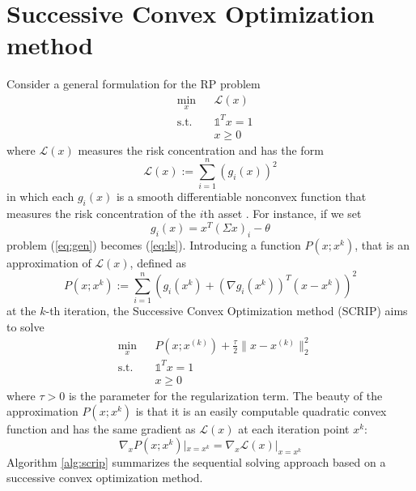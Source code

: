 \section{Successive Convex Optimization method}
Consider a general formulation for the RP problem
\begin{equation}\label{eq:gen}
\begin{aligned}
& \underset{x}{\text{min}}
&& \mathcal{L}(x)\\
& \text{s.t.}
&&\mathds{1}^T x = 1\\
&&&x \geq 0
\end{aligned}
\end{equation}
where $\mathcal{L}(x)$ measures the risk concentration and has the form
\begin{equation}
\mathcal{L}(x) := \sum_{i=1}^n (g_i(x))^2
\end{equation}
in which each $g_i(x)$ is a smooth differentiable nonconvex
function that measures the risk concentration of the $i$th asset \cite{scrip}. For instance, if we set
\begin{equation}
g_i(x) = x^T (\Sigma x)_i - \theta
\end{equation}
problem (\ref{eq:gen}) becomes (\ref{eq:ls}). Introducing a function $P(x;x^{k})$, that is an approximation of $\mathcal{L}(x)$, defined as
\begin{equation}
P(x;x^{k}) := \sum_{i=1}^n (g_i(x^{k}) + (\nabla g_i(x^{k}))^T (x-x^{k}))^2
\end{equation}
at the $k$-th iteration, the Successive Convex Optimization method (SCRIP) aims to solve 
\begin{equation}\label{eq:scrip1}
\begin{aligned}
& \underset{x}{\text{min}}
&&P(x;x^{(k)}) + \frac{\tau}{2}\parallel x - x^{(k)} \parallel^2_2\\
& \text{s.t.}
&&\mathds{1}^T x = 1\\
&&&x \geq 0
\end{aligned}
\end{equation}
where $\tau > 0$ is the parameter for the regularization term. The beauty of the approximation $P(x;x^{k})$ is that it is an
easily computable quadratic convex function and has the same
gradient as $\mathcal{L}(x)$ at each iteration point $x^{k}$:
\begin{equation}
\nabla_x P(x;x^{k})|_{x=x^{k}} = \nabla_x \mathcal{L}(x)|_{x=x^{k}}
\end{equation}
Algorithm \ref{alg:scrip} summarizes the sequential solving approach based on a successive convex optimization method.

